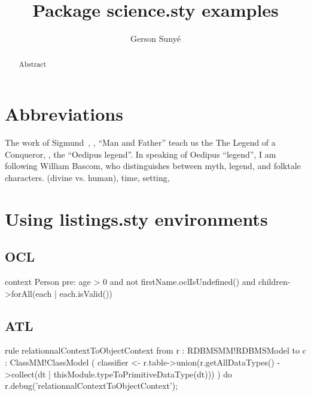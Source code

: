\documentclass{article}
\title{Package science.sty examples}
\author{Gerson Sunyé}
\begin{document}
\maketitle

\begin{abstract}
    Abstract
\end{abstract}

\section{Abbreviations}

The work of Sigmund~\etal, \eg, ``Man and Father'' teach us the The Legend of a Conqueror, \ie, the ``Oedipus legend''.
In speaking of Oedipus ``legend'', I am following William Bascom,
who distinguishes between myth, legend, and folktale \wrt characters. (divine vs. human), time, setting,  \etc


\section{Using listings.sty environments}

\subsection{OCL}

\begin{ocl}
context Person
pre: 
	age > 0 and 
	not firstName.oclIsUndefined() and
	children->forAll(each | each.isValid())
\end{ocl}



\subsection{ATL}

\begin{atl}
rule relationnalContextToObjectContext {
	from
		r : RDBMSMM!RDBMSModel
	to
		c : ClassMM!ClassModel (
			classifier <- r.table->union(r.getAllDataTypes()
				->collect(dt | thisModule.typeToPrimitiveDataType(dt)))
		)
	do {
		r.debug('relationnalContextToObjectContext');
	}
}
\end{atl}
\end{document}
